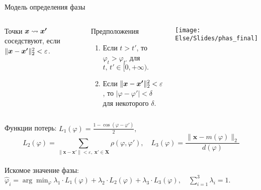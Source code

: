 \documentclass{beamer}
\def\vec#1{\mathchoice{\mbox{\boldmath$\displaystyle#1$}}
{\mbox{\boldmath$\textstyle#1$}} {\mbox{\boldmath$\scriptstyle#1$}} {\mbox{\boldmath$\scriptscriptstyle#1$}}}
\begin{document}
\begin{frame}{Модель определения фазы}
\begin{columns}
Точки $\vec{x} \rightsquigarrow \vec{x'}$ соседствуют, если $\| \vec{x}  - \vec{x'}\|_2^2 < \varepsilon$. 
\begin{alertblock}{Предположения}
\begin{enumerate}
   \item Если $t > t'$, то $\varphi_t > \varphi_{t'}$ для~$t,\, t' \in [0,+\infty).$
    
\item Если $\| \vec{x} - \vec{x'} \|_2^2 < \varepsilon$, то $| \varphi - \varphi'|<\delta$\\для некоторого $\delta$.
\end{enumerate}
\end{alertblock}

\texttt{[image: Else/Slides/phas\_final]}
\end{columns} 
Функции потерь: $ L_1(\varphi) =
        \frac{1-\cos(\varphi-\varphi')}{2},$\[L_2(\varphi) = 
    \sum_{\| \mathbf{x} - \mathbf{x'} \|<\varepsilon, \; \mathbf{x'} \in \mathbf{X}}\rho( \varphi, \varphi'), \quad L_3(\varphi) = \frac{\|\mathbf{x} - m(\varphi)\|_2}{d(\varphi)}\]\\
Искомое значение фазы:
$\widehat{\varphi}_i = \arg\min_{\varphi} \lambda_1\cdot L_1(\varphi) + \lambda_2 \cdot L_2(\varphi) + \lambda_3 \cdot L_3(\varphi), \quad \sum_{i=1}^{3} \lambda_i = 1.$
    





\end{frame}
\end{document}
